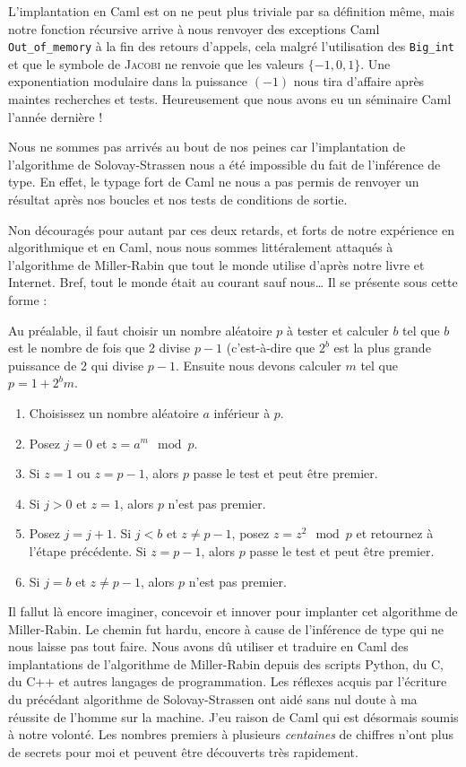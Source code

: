 \documentclass[a4paper,12pt]{article}
\begin{document}
L'implantation en Caml est on ne peut plus triviale par sa définition même, mais notre fonction récursive arrive à nous renvoyer des exceptions Caml \texttt{Out\_of\_memory} à la fin des retours d'appels, cela malgré l'utilisation des \texttt{Big\_int} et que le symbole de \textsc{Jacobi} ne renvoie que les valeurs $\{- 1, 0, 1\}$. Une exponentiation modulaire dans la puissance $(- 1)$ nous tira d'affaire après maintes recherches et tests. Heureusement que nous avons eu un séminaire Caml l'année dernière !

Nous ne sommes pas arrivés au bout de nos peines car l'implantation de l'algorithme de Solovay-Strassen nous a été impossible du fait de l'inférence de type. En effet, le typage fort de Caml ne nous a pas permis de renvoyer un résultat après nos boucles et nos tests de conditions de sortie.

\bigskip

Non découragés pour autant par ces deux retards, et forts de notre expé\-rience en algorithmique et en Caml, nous nous sommes littéralement attaqués à l'algorithme de Miller-Rabin que \og tout le monde utilise \fg{} d'après notre livre et Internet. Bref, tout le monde était au courant sauf nous\dots{} Il se présente sous cette forme :

Au préalable, il faut choisir un nombre aléatoire $p$ à tester et calculer $b$ tel que $b$ est le nombre de fois que 2 divise $p - 1$ (c'est-à-dire que $2^b$ est la plus grande puissance de 2 qui divise $p - 1$. Ensuite nous devons calculer $m$ tel que $p = 1 + 2^{b}m$.

\begin{enumerate}
\item Choisissez un nombre aléatoire $a$ inférieur à $p$.
\item Posez $j = 0$ et $z = a^{m} \mod p$.
\item Si $z = 1$ ou $z = p - 1$, alors $p$ passe le test et peut être premier.
\item Si $j > 0$ et $z = 1$, alors $p$ n'est pas premier.
\item Posez $j = j + 1$. Si $j < b$ et $z \ne p - 1$, posez $z = z^{2} \mod p$ et retournez à l'étape précédente. Si $z = p - 1$, alors $p$ passe le test et peut être premier.
\item Si $j = b$ et $z \ne p - 1$, alors $p$ n'est pas premier.
\end{enumerate}

Il fallut là encore imaginer, concevoir et innover pour implanter cet algorithme de Miller-Rabin. Le chemin fut hardu, encore à cause de l'inférence de type qui ne nous laisse pas tout faire. Nous avons dû utiliser et traduire en Caml des implantations de l'algorithme de Miller-Rabin depuis des scripts Python, du C, du C++ et autres langages de programmation. Les réflexes acquis par l'écriture du précédant algorithme de Solovay-Strassen ont aidé sans nul doute à ma réussite de l'homme sur la machine. J'eu raison de Caml qui est désormais soumis à notre volonté. Les nombres premiers à plusieurs \emph{centaines} de chiffres n'ont plus de secrets pour moi et peuvent être découverts très rapidement.
\end{document}
